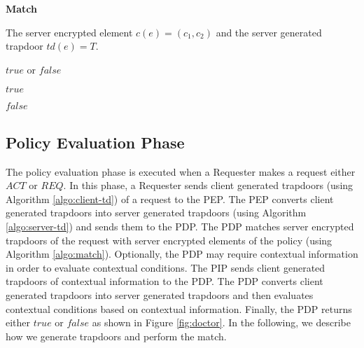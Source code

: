 \documentclass[final,5p,times,twocolumn]{elsarticle}
\newcommand{\algofontsize}{\fontsize{7}{8}\selectfont}
\begin{document}
\begin{algorithm}[h]
{\algofontsize
\caption{\textbf{Match}}

\label{algo:match}

\begin{algorithmic}[1]

\REQUIRE The server encrypted element $c(e) = (c_1, c_2)$ and the server generated trapdoor $td(e) = T$.

\ENSURE $\mathit{true}$ or $\mathit{false}$

\medskip

 \label{line:match-condition}

	\RETURN $\mathit{true}$ \label{line:match-true}
	
\ELSE

	\RETURN $\mathit{false}$ \label{line:match-false}
	
\ENDIF

\end{algorithmic}
}
\end{algorithm}


\subsection{Policy Evaluation Phase}

The policy evaluation phase is executed when a Requester makes a request either $\mathit{ACT}$ or $\mathit{REQ}$. In this phase, a Requester sends client generated trapdoors (using Algorithm \ref{algo:client-td}) of a request to the PEP. The PEP converts client generated trapdoors into server generated trapdoors (using Algorithm \ref{algo:server-td}) and sends them to the PDP. The PDP matches server encrypted trapdoors of the request with server encrypted elements of the policy (using Algorithm \ref{algo:match}). Optionally, the PDP may require contextual information in order to evaluate contextual conditions. The PIP sends client generated trapdoors of contextual information to the PDP. The PDP converts client generated trapdoors into server generated trapdoors and then evaluates contextual conditions based on contextual information. Finally, the PDP returns either $\mathit{true}$ or $\mathit{false}$ as shown in Figure \ref{fig:doctor}. In the following, we describe how we generate trapdoors and perform the match. 
\end{document}
